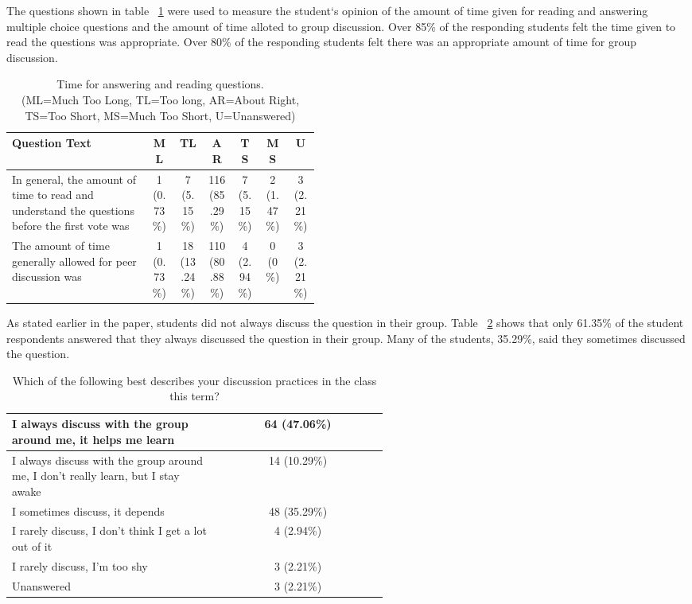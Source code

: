 \documentclass{article}
\begin{document}
The questions shown in table ~\ref{table:timeForQuestions} were used to measure the student`s opinion of the amount of time given for reading and answering multiple choice questions and the amount of time alloted to group discussion. Over 85\% of the responding students felt the time given to read the questions was appropriate. Over 80\% of the responding students felt there was an appropriate amount of time for group discussion. 

\begin{table}[ht]
\caption{Time for answering and reading questions.\\\hspace{\textwidth} (ML=Much Too Long, TL=Too long, AR=About Right, TS=Too Short, MS=Much Too Short, U=Unanswered)}
\begin{tabular}{p{0.45\linewidth} |c|c|c|c|c|c} %
\toprule
Question Text & ML & TL & AR & TS & MS & U \\ \midrule
\rowcolor{LightGray}
In general, the amount of time to read and understand the questions before the first vote was & 1 (0.73\%) & 7 (5.15\%) & 116 (85.29\%) & 7 (5.15\%) & 2 (1.47\%) & 3 (2.21\%) \\ \midrule
The amount of time generally allowed for peer discussion was & 1 (0.73\%) & 18 (13.24\%) & 110 (80.88\%) & 4 (2.94\%) & 0 (0\%) & 3 (2.21\%) \\ \bottomrule
\end{tabular}
\label{table:timeForQuestions}
\end{table}

As stated earlier in the paper, students did not always discuss the question in their group. Table ~\ref{table:groupDiscussion} shows that only 61.35\% of the student respondents answered that they always discussed the question in their group. Many of the students, 35.29\%, said they sometimes discussed the question. 

\begin{table}[ht]
\caption{Which of the following best describes your discussion practices in the class this term?}
\begin{tabular}{p{0.55\linewidth}|c} %
\toprule
 \rowcolor{LightGray} 
 I always discuss with the group around me, it helps me learn & 64 (47.06\%)\\\midrule 
 I always discuss with the group around me, I don't really learn, but I stay awake & 14 (10.29\%)\\\midrule 
 \rowcolor{LightGray}
 I sometimes discuss, it depends & 48 (35.29\%)\\\midrule 
 I rarely discuss, I don't think I get a lot out of it & 4 (2.94\%)\\\midrule 
 \rowcolor{LightGray}
 I rarely discuss, I'm too shy & 3 (2.21\%)\\\midrule 
 Unanswered & 3 (2.21\%)\\\bottomrule 
\end{tabular}
\label{table:groupDiscussion}
\end{table}
\end{document}
